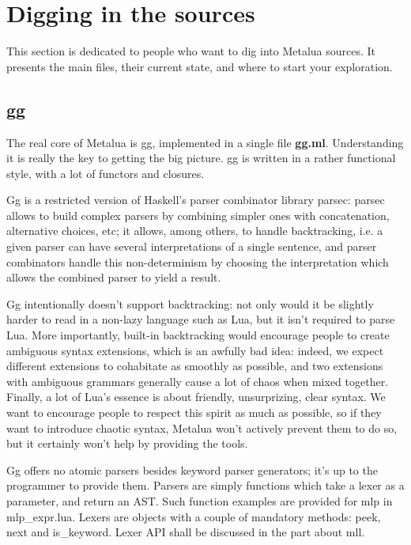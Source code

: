\section{Digging in the sources}

This section is dedicated to people who want to dig into Metalua
sources. It presents the main files, their current state, and where to
start your exploration.

\subsection{gg}

The real core of Metalua is gg, implemented in a single file {\bf
  gg.ml}. Understanding it is really the key to getting the big
picture. gg is written in a rather functional style, with a lot of
functors and closures.

Gg is a restricted version of Haskell's parser combinator library
parsec: parsec allows to build complex parsers by combining simpler
ones with concatenation, alternative choices, etc; it allows, among
others, to handle backtracking, i.e. a given parser can have several
interpretations of a single sentence, and parser combinators handle
this non-determinism by choosing the interpretation which allows the
combined parser to yield a result.

Gg intentionally doesn't support backtracking: not only would it be
slightly harder to read in a non-lazy language such as Lua, but it
isn't required to parse Lua. More importantly, built-in backtracking
would encourage people to create ambiguous syntax extensions, which is
an awfully bad idea: indeed, we expect different extensions to
cohabitate as smoothly as possible, and two extensions with ambiguous
grammars generally cause a lot of chaos when mixed together. Finally,
a lot of Lua's essence is about friendly, unsurprizing, clear
syntax. We want to encourage people to respect this spirit as
much as possible, so if they want to introduce chaotic syntax, Metalua
won't actively prevent them to do so, but it certainly won't help by
providing the tools.

Gg offers no atomic parsers besides keyword parser generators; it's up
to the programmer to provide them. Parsers are simply functions which
take a lexer as a parameter, and return an AST. Such function examples
are provided for mlp in mlp\_expr.lua. Lexers are objects with a
couple of mandatory methods: peek, next and is\_keyword. Lexer API
shall be discussed in the part about mll.

